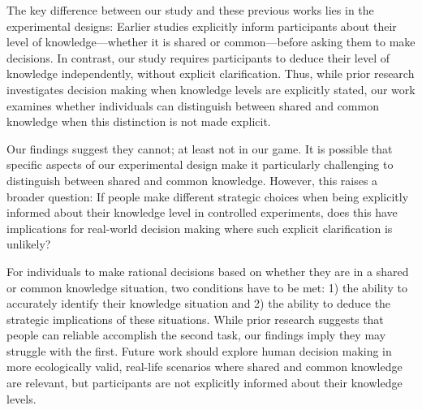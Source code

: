 The key difference between our study and these previous works lies in the experimental designs: Earlier studies explicitly inform participants about their level of knowledge---whether it is shared or common---before asking them to make decisions. In contrast, our study requires participants to deduce their level of knowledge independently, without explicit clarification. 
Thus, while prior research investigates %
decision making when knowledge levels are explicitly stated, our work examines whether individuals can distinguish between shared and common knowledge when this distinction is not made explicit. 

Our findings suggest they cannot; at least not in our game. It is possible that 
specific aspects of our %
experimental design make it particularly challenging to distinguish between shared and common knowledge. %
However, this raises a broader question: If people make different strategic choices when being explicitly informed about %
their knowledge level in controlled experiments, %
does this have implications for real-world decision making %
where such explicit clarification is unlikely?

For individuals to make rational decisions based on %
whether they are in a shared or common knowledge situation, %
two conditions have to be met: 1) the ability to accurately identify %
their knowledge situation %
and 2) the ability to deduce the strategic implications of these %
situations. 
While prior research suggests that %
people %
can reliable accomplish the %
second task, our findings imply they %
may struggle with the first. %
Future work %
should explore human decision making in more ecologically valid, real-life scenarios where shared and common knowledge are relevant, %
but %
participants are not explicitly informed about their knowledge levels.

